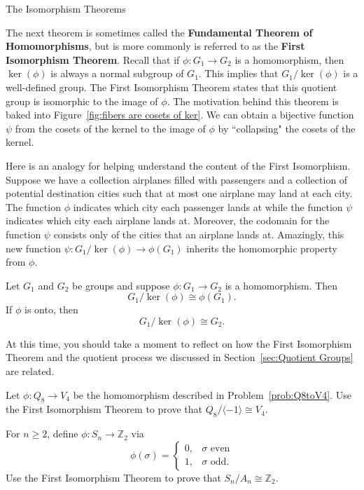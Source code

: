 \begin{section}{The Isomorphism Theorems}

The next theorem is sometimes called the \textbf{Fundamental Theorem of Homomorphisms}, but is more commonly is referred to as the \textbf{First Isomorphism Theorem}. Recall that if $\phi:G_1\to G_2$ is a homomorphism, then $\ker(\phi)$ is always a normal subgroup of $G_1$.  This implies that $G_1/\ker(\phi)$ is a well-defined group.  The First Isomorphism Theorem states that this quotient group is isomorphic to the image of $\phi$. The motivation behind this theorem is baked into Figure~\ref{fig:fibers are cosets of ker}. We can obtain a bijective function $\psi$ from the cosets of the kernel to the image of $\phi$ by ``collapsing" the cosets of the kernel.

Here is an analogy for helping understand the content of the First Isomorphism.  Suppose we have a collection airplanes filled with passengers and a collection of potential destination cities such that at most one airplane may land at each city.  The function $\phi$ indicates which city each passenger lands at while the function $\psi$ indicates which city each airplane lands at.  Moreover, the codomain for the function $\psi$ consists only of the cities that an airplane lands at. Amazingly, this new function $\psi:G_1/\ker(\phi)\to \phi(G_1)$ inherits the homomorphic property from $\phi$.

\begin{theorem}
Let $G_1$ and $G_2$ be groups and suppose $\phi:G_1\to G_2$ is a homomorphism. Then
\[
G_1/\ker(\phi)\cong \phi(G_1).
\]
If $\phi$ is onto, then
\[
G_1/\ker(\phi)\cong G_2.
\]
\end{theorem}

At this time, you should take a moment to reflect on how the First Isomorphism Theorem and the quotient process we discussed in Section~\ref{sec:Quotient Groups} are related.

\begin{problem}
Let $\phi:Q_8\to V_4$ be the homomorphism described in Problem~\ref{prob:Q8toV4}. Use the First Isomorphism Theorem to prove that $Q_8/\langle-1\rangle\cong V_4$.
\end{problem}

\begin{problem}
For $n\geq 2$, define $\phi:S_n\to \mathbb{Z}_2$ via
\[
\phi(\sigma)=\begin{cases}
0, & \sigma \text{ even}\\
1, & \sigma \text{ odd}.
\end{cases}
\]
Use the First Isomorphism Theorem to prove that $S_n/A_n\cong \mathbb{Z}_2$.
\end{problem}


\end{section}
